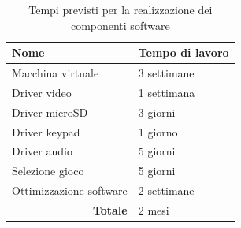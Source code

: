 \documentclass[a4paper]{article}
\begin{document}
\begin{center}
	\begin{table}[ht]
		\centering
		\begin{tabular}{|l|l|}
			\hline
			\textbf{Nome}                         & \textbf{Tempo di lavoro} \\ \hline
			Macchina virtuale                     & 3 settimane              \\ \hline
			Driver video                          & 1 settimana              \\ \hline
			Driver microSD                        & 3 giorni                 \\ \hline
			Driver keypad                         & 1 giorno                 \\ \hline
			Driver audio                          & 5 giorni                 \\ \hline
			Selezione gioco                       & 5 giorni                 \\ \hline
			Ottimizzazione software               & 2 settimane              \\ \hline
			\multicolumn{1}{|r|}{\textbf{Totale}} & 2 mesi                   \\ \hline
		\end{tabular}
		\caption{
			Tempi previsti per la realizzazione dei componenti software
		}
	\end{table}

\end{center}
\end{document}
